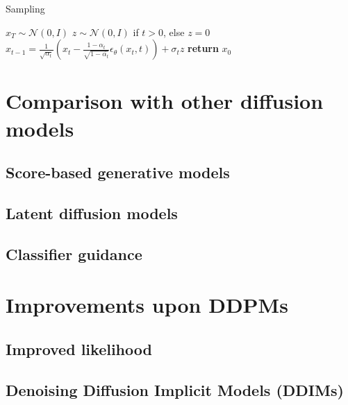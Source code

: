 \documentclass{article}
\begin{document}
\hfill
\begin{minipage}{0.49\textwidth}
  \begin{algorithm}[H]
    \centering
    \caption{Sampling}\label{alg:sampling}
    \begin{algorithmic}[1]
      \State $x_T \sim \mathcal{N}(0, I)$
        \State $z \sim \mathcal{N}(0, I)$ if $t > 0$, else $z = 0$
        \State $x_{t-1} = \frac{1}{\sqrt{\alpha_t}} \left( x_t - \frac{1 - \alpha_t}{\sqrt{1 - \bar{\alpha_t}}} \epsilon_\theta (x_t, t) \right) + \sigma_t z $
      \EndFor
      \State \textbf{return} $x_0$
    \end{algorithmic}
  \end{algorithm}
\end{minipage}





\section{Comparison with other diffusion models}

\subsection{Score-based generative models}

\subsection{Latent diffusion models}

\subsection{Classifier guidance}


\newpage
\section{Improvements upon DDPMs}

\subsection{Improved likelihood}

\subsection{Denoising Diffusion Implicit Models (DDIMs)}
\end{document}
